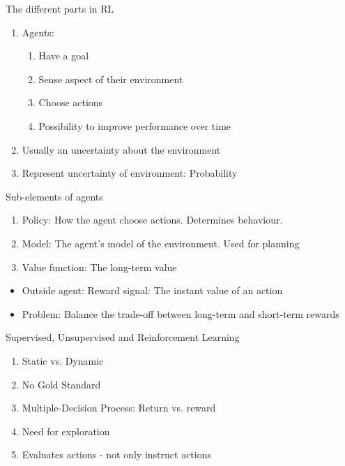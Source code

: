 \documentclass[10pt]{beamer}
\begin{document}
\begin{frame}{The different parts in RL}

\begin{enumerate}
\item Agents:
\begin{enumerate}
\item Have a {\color{uured} goal}
\item {\color{uured} Sense} aspect of their environment
\item Choose {\color{uured} actions}
\item Possibility to {\color{uured} improve performance over time}
\end{enumerate}
\pause
\item Usually an {\color{uured} uncertainty} about the environment
\item Represent uncertainty of environment: {\color{uured} Probability}
\end{enumerate}

\end{frame}


\begin{frame}{Sub-elements of agents}

\begin{enumerate}
\item {\color{uured} Policy}: How the agent choose actions. Determines behaviour.
\item {\color{uured} Model}: The agent's model of the environment. Used for {\color{uured} planning}\pause
\item {\color{uured} Value function}: The long-term value\pause
\end{enumerate}
\pause
\begin{itemize}
\item Outside agent: {\color{uured} Reward signal}: The instant value of an action\pause
\item Problem: {\color{uured} Balance} the trade-off between long-term and short-term rewards
\end{itemize}

\end{frame}

\begin{frame}{Supervised, Unsupervised and Reinforcement Learning}

\begin{enumerate}
\item Static vs. Dynamic \pause
\item No Gold Standard \pause
\item Multiple-Decision Process: Return vs. reward\pause
\item Need for exploration\pause
\item Evaluates actions - not only instruct actions
\end{enumerate}

\end{frame}
\end{document}
